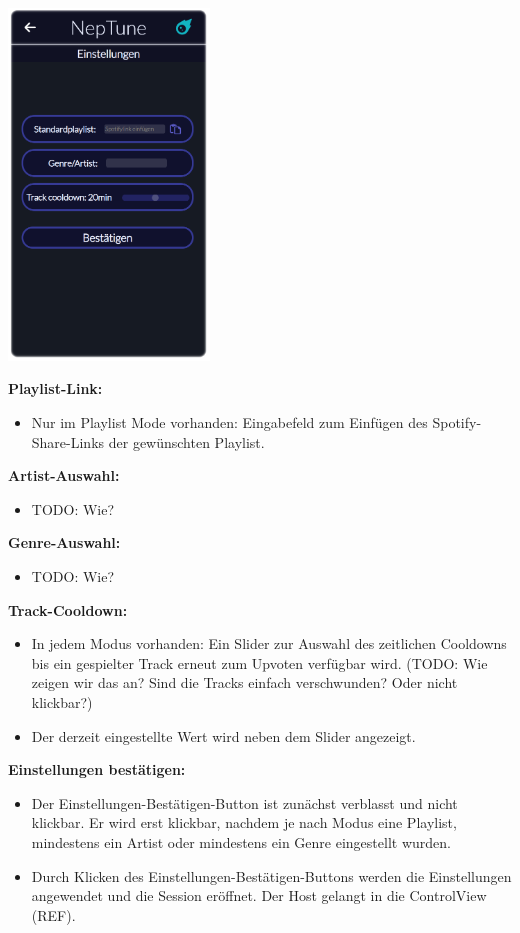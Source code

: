 \documentclass[oneside, ngerman]{sdqtechreport}
\begin{document}
\begin{center}
    \hypertarget{hostModeSettingsView}{}
    \includegraphics[width=0.4\textwidth]{LATEX/Pflichtenheft/GraphicDesigns/hostModusSettingsPage.png}
\end{center}

\textbf{Playlist-Link:}
\begin{itemize}
    \item Nur im Playlist Mode vorhanden: Eingabefeld zum Einfügen des Spotify-Share-Links der gewünschten Playlist.
\end{itemize}

\textbf{Artist-Auswahl:}
\begin{itemize}
    \item TODO: Wie?
\end{itemize}

\textbf{Genre-Auswahl:}
\begin{itemize}
    \item TODO: Wie?
\end{itemize}

\textbf{Track-Cooldown:}
\begin{itemize}
    \item In jedem Modus vorhanden: Ein Slider zur Auswahl des zeitlichen Cooldowns bis ein gespielter Track erneut zum Upvoten verfügbar wird. (TODO: Wie zeigen wir das an? Sind die Tracks einfach verschwunden? Oder nicht klickbar?)
    \item Der derzeit eingestellte Wert wird neben dem Slider angezeigt.
\end{itemize}

\textbf{Einstellungen bestätigen:}
\begin{itemize}
    \item Der Einstellungen-Bestätigen-Button ist zunächst verblasst und nicht klickbar. Er wird erst klickbar, nachdem je nach Modus eine Playlist, mindestens ein Artist oder mindestens ein Genre eingestellt wurden.
    \item Durch Klicken des Einstellungen-Bestätigen-Buttons werden die Einstellungen angewendet und die Session eröffnet. Der Host gelangt in die ControlView (REF).
\end{itemize}
\end{document}
